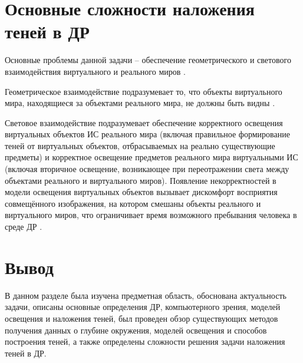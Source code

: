 \section{Основные сложности наложения теней в ДР}

Основные проблемы данной задачи -- обеспечение геометрического и светового взаимодействия виртуального и реального миров \cite{sns_tras}.

Геометрическое взаимодействие подразумевает то, что объекты виртуального мира, находящиеся за объектами реального мира, не должны быть видны \cite{sns_tras}.

Световое взаимодействие подразумевает обеспечение корректного освещения виртуальных объектов ИС реального мира (включая правильное формирование теней от виртуальных объектов, отбрасываемых на реально существующие предметы) и корректное освещение предметов реального мира виртуальными ИС (включая вторичное освещение, возникающее при переотражении света между объектами реального и виртуального миров). Появление некорректностей в модели освещения виртуальных объектов вызывает дискомфорт восприятия совмещённого изображения, на котором  смешаны объекты реального и виртуального миров, что ограничивает время возможного пребывания человека в среде ДР \cite{sns_tras}.

\section*{Вывод}

В данном разделе была изучена предметная область, обоснована актуальность задачи, описаны основные определения ДР, компьютерного зрения, моделей освещения и наложения теней, был проведен обзор существующих методов получения данных о глубине окружения, моделей освещения и способов построения теней, а также определены сложности решения задачи наложения теней в ДР.